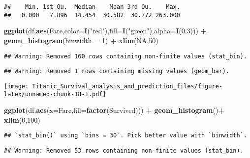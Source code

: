 \documentclass[]{article}
\newenvironment{Shaded}{\begin{snugshade}}{\end{snugshade}}
\newcommand{\KeywordTok}[1]{\textcolor[rgb]{0.13,0.29,0.53}{\textbf{#1}}}
\newcommand{\DataTypeTok}[1]{\textcolor[rgb]{0.13,0.29,0.53}{#1}}
\newcommand{\DecValTok}[1]{\textcolor[rgb]{0.00,0.00,0.81}{#1}}
\newcommand{\FloatTok}[1]{\textcolor[rgb]{0.00,0.00,0.81}{#1}}
\newcommand{\StringTok}[1]{\textcolor[rgb]{0.31,0.60,0.02}{#1}}
\newcommand{\OtherTok}[1]{\textcolor[rgb]{0.56,0.35,0.01}{#1}}
\newcommand{\OperatorTok}[1]{\textcolor[rgb]{0.81,0.36,0.00}{\textbf{#1}}}
\newcommand{\NormalTok}[1]{#1}
\begin{document}
\begin{verbatim}
##    Min. 1st Qu.  Median    Mean 3rd Qu.    Max. 
##   0.000   7.896  14.454  30.582  30.772 263.000
\end{verbatim}

\begin{Shaded}
\begin{Highlighting}[]
\KeywordTok{ggplot}\NormalTok{(df,}\KeywordTok{aes}\NormalTok{(Fare,}\DataTypeTok{color=}\KeywordTok{I}\NormalTok{(}\StringTok{"red"}\NormalTok{),}\DataTypeTok{fill=}\KeywordTok{I}\NormalTok{(}\StringTok{"green"}\NormalTok{),}\DataTypeTok{alpha=}\KeywordTok{I}\NormalTok{(}\FloatTok{0.3}\NormalTok{))) }\OperatorTok{+}\StringTok{ }\KeywordTok{geom_histogram}\NormalTok{(}\DataTypeTok{binwidth =} \DecValTok{1}\NormalTok{) }\OperatorTok{+}\StringTok{ }\KeywordTok{xlim}\NormalTok{(}\OtherTok{NA}\NormalTok{,}\DecValTok{50}\NormalTok{)}
\end{Highlighting}
\end{Shaded}

\begin{verbatim}
## Warning: Removed 160 rows containing non-finite values (stat_bin).
\end{verbatim}

\begin{verbatim}
## Warning: Removed 1 rows containing missing values (geom_bar).
\end{verbatim}

\texttt{[image: Titanic\_Survival\_analysis\_and\_prediction\_files/figure-latex/unnamed-chunk-18-1.pdf]}

\begin{Shaded}
\begin{Highlighting}[]
\KeywordTok{ggplot}\NormalTok{(df,}\KeywordTok{aes}\NormalTok{(}\DataTypeTok{x=}\NormalTok{Fare,}\DataTypeTok{fill=}\KeywordTok{factor}\NormalTok{(Survived))) }\OperatorTok{+}\StringTok{ }\KeywordTok{geom_histogram}\NormalTok{()}\OperatorTok{+}\StringTok{ }\KeywordTok{xlim}\NormalTok{(}\DecValTok{0}\NormalTok{,}\DecValTok{100}\NormalTok{)}
\end{Highlighting}
\end{Shaded}

\begin{verbatim}
## `stat_bin()` using `bins = 30`. Pick better value with `binwidth`.
\end{verbatim}

\begin{verbatim}
## Warning: Removed 53 rows containing non-finite values (stat_bin).
\end{verbatim}
\end{document}
